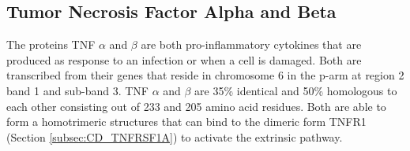 \subsection{Tumor Necrosis Factor Alpha and Beta}
The proteins TNF $\alpha$ and $\beta$ are both pro-inflammatory cytokines that are produced as response to an infection or when a cell is damaged. Both are transcribed from their genes that reside in chromosome 6 in the p-arm at region 2 band 1 and sub-band 3. TNF $\alpha$ and $\beta$ are 35\% identical and 50\% homologous to each other consisting out of 233 and 205 amino acid residues. Both are able to form a homotrimeric structures that can bind to the dimeric form TNFR1 (Section \ref{subsec:CD_TNFRSF1A}) to activate the extrinsic pathway\cite{aggarwal_characterization_1985,hamosh_omim_2014,kriegler_novel_1988,walter_encyclopedia_2007}. 
\label{subsec:CD_TNF_A_B}